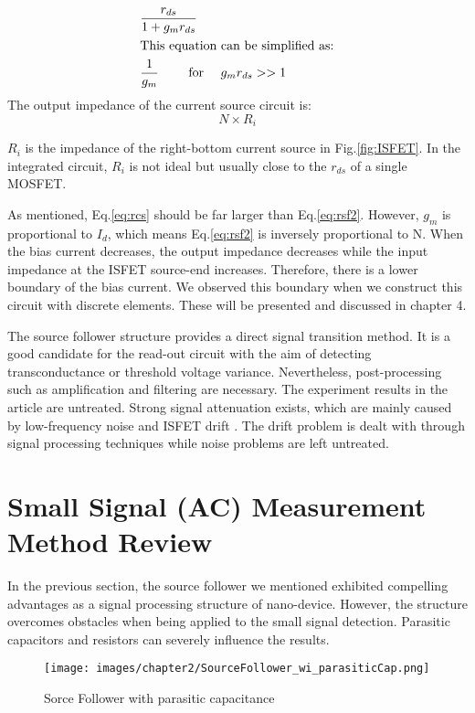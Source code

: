 \begin{align}
    & \frac{r_{ds}}{1 + g_mr_{ds}}\\
\intertext{This equation can be simplified as:}
    & \frac{1}{g_m} \qquad \text{ for } \quad g_mr_{ds} >> 1 \label{eq:rsf2}
\end{align}
The output impedance of the current source circuit is:
\begin{equation} \label{eq:rcs}
    N\times R_i
\end{equation}

$R_i$ is the impedance of the right-bottom current source in Fig.\ref{fig:ISFET}.
In the integrated circuit, $R_i$ is not ideal but usually close to the $r_{ds}$ of a single MOSFET.

As mentioned, Eq.\ref{eq:rcs} should be far larger than Eq.\ref{eq:rsf2}.
However, $g_m$ is proportional to $I_d$, which means Eq.\ref{eq:rsf2} is inversely proportional to N.
When the bias current decreases, the output impedance decreases while the input impedance at the ISFET source-end increases.
Therefore, there is a lower boundary of the bias current.
We observed this boundary when we construct this circuit with discrete elements.
These will be presented and discussed in chapter 4.

The source follower structure provides a direct signal transition method.
It is a good candidate for the read-out circuit with the aim of detecting transconductance or threshold voltage variance.
Nevertheless, post-processing such as amplification and filtering are necessary.
The experiment results in the article are untreated.
Strong signal attenuation exists, which are mainly caused by low-frequency noise and ISFET drift \cite{Drift}.
The drift problem is dealt with through signal processing techniques while noise problems are left untreated.


\section{Small Signal (AC) Measurement Method Review}
In the previous section, the source follower we mentioned exhibited compelling advantages as a signal processing structure of nano-device.
However, the structure overcomes obstacles when being applied to the small signal detection.
Parasitic capacitors and resistors can severely influence the results.

\begin{figure}[ht]
    \centering
    \texttt{[image: images/chapter2/SourceFollower\_wi\_parasiticCap.png]}
    \fontsize{6}{7}\selectfont
    \caption{Sorce Follower with parasitic capacitance}
    \label{fig:SF_pC}
\end{figure}

